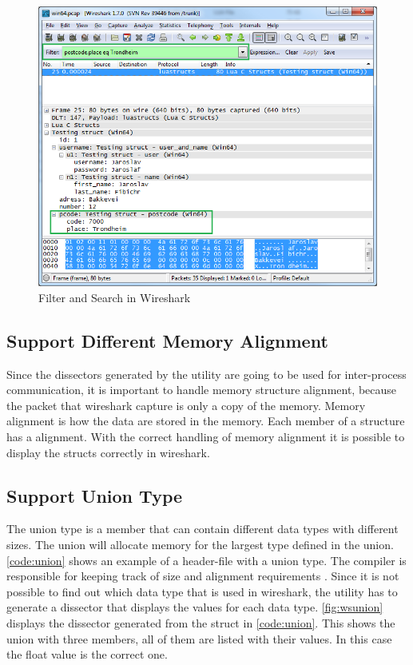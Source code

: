 \begin{figure}[htbp]
	\center
	\includegraphics[width=\textwidth]{./sprints/img/wireshark_filter}
	\caption{Filter and Search in Wireshark\label{fig:wsfilter}}
\end{figure}

\subsection{Support Different Memory Alignment}
Since the \glspl{dissector} generated by the \gls{utility} are going to be used for 
inter-process communication, it is important to handle memory structure 
alignment, because the \gls{packet} that \Gls{wireshark} capture is only a copy of the 
memory. Memory alignment is how the data are stored in the memory. Each \gls{member} 
of a structure has a alignment. With the correct handling of memory alignment it is 
possible to display the \glspl{struct} correctly in \Gls{wireshark}.

\subsection{Support Union Type}
The \gls{union} type is a \gls{member} that can contain different data types with 
different sizes. The \gls{union} will allocate memory for the largest type defined 
in the \gls{union}. \autoref{code:union} shows an example of a \gls{header}-file with a 
\gls{union} type. The compiler is responsible for keeping track of size and 
alignment requirements\cite[p.147]{Kerninghan1988} . Since it is not 
possible to find out which data type that is used in \Gls{wireshark}, the \gls{utility} 
has to generate a \gls{dissector} that displays the values for each data type. 
\autoref{fig:wsunion} displays the \gls{dissector} generated from the \gls{struct} in 
\autoref{code:union}. This shows the \gls{union} with three \glspl{member}, all of them are 
listed with their values. In this case the \gls{float} value is the correct one.

